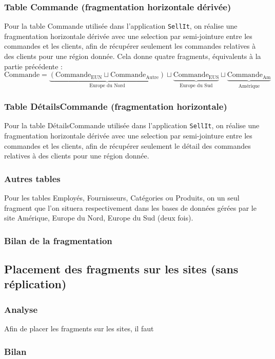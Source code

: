 \documentclass[10pt,a4paper]{article}
\theoremstyle{plain}
\begin{document}
\subsubsection{Table Commande (fragmentation horizontale dérivée)}
Pour la table Commande utilisée dans l'application \verb|SellIt|, on réalise une fragmentation horizontale dérivée avec une selection par semi-jointure entre les commandes et les clients, afin de récupérer seulement les commandes relatives à des clients pour une région donnée. Cela donne quatre fragments, équivalents à la partie précédente :
\[\text{Commande}=\underbrace{(\text{Commande}_{\text{EUN}}\sqcup\text{Commande}_{\text{Autre}})}_{\text{Europe du Nord}}\sqcup\underbrace{\text{Commande}_{\text{EUS}}}_{\text{Europe du Sud}}\sqcup\underbrace{\text{Commande}_{\text{Am}}}_{\text{Amérique}}\]

\subsubsection{Table DétailsCommande (fragmentation horizontale)}
Pour la table DétailsCommande utilisée dans l'application \verb|SellIt|, on réalise une fragmentation horizontale dérivée avec une selection par semi-jointure entre les commandes et les clients, afin de récupérer seulement le détail des commandes relatives à des clients pour une région donnée. 

\subsubsection{Autres tables}
Pour les tables Employés, Fournisseurs, Catégories ou Produits, on un seul fragment que l'on situera respectivement dans les bases de données gérées par le site Amérique, Europe du Nord, Europe du Sud (deux fois).

\subsubsection{Bilan de la fragmentation}

\subsection{Placement des fragments sur les sites (sans réplication)}
\subsubsection{Analyse}
Afin de placer les fragments sur les sites, il faut 
\subsubsection{Bilan}
\end{document}
